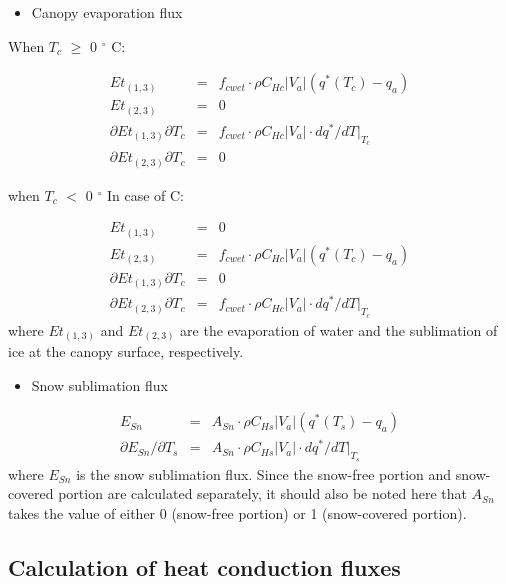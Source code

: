 \begin{itemize}
\tightlist
\item
  Canopy evaporation flux
\end{itemize}

When \(T_c\) \(\geq\) 0 \(^{\circ}\) C:

\begin{eqnarray}
 Et_{(1,3)} &=&
  f_{cwet} \cdot \rho C_{Hc}|V_a|(q^\ast(T_c) - q_a) \\
 Et_{(2,3)} &=& 0 \\
 \partial Et_{(1,3)} \partial T_c &=&
  f_{cwet} \cdot \rho C_{Hc}|V_a|\cdot dq^\ast/dT|_{T_c} \\
 \partial Et_{(2,3)} \partial T_c &=& 0
\end{eqnarray}

when \(T_c\) \(<\) 0 \(^{\circ}\) In case of C:

\begin{eqnarray}
 Et_{(1,3)} &=& 0 \\
 Et_{(2,3)} &=&
  f_{cwet} \cdot \rho C_{Hc}|V_a|(q^\ast(T_c) - q_a) \\
 \partial Et_{(1,3)} \partial T_c &=& 0 \\
 \partial Et_{(2,3)} \partial T_c &=&
  f_{cwet} \cdot \rho C_{Hc}|V_a|\cdot dq^\ast/dT|_{T_c}
\end{eqnarray} where \(Et_{(1,3)}\) and \(Et_{(2,3)}\) are the evaporation of water and the sublimation of ice at the canopy surface, respectively.

\begin{itemize}
\tightlist
\item
  Snow sublimation flux
\end{itemize}

\begin{eqnarray}
 E_{Sn} &=& A_{Sn}\cdot \rho C_{Hs}|V_a|(q^\ast(T_s) - q_a) \\
 \partial E_{Sn}/\partial T_s &=& A_{Sn}\cdot \rho C_{Hs}|V_a|
 \cdot dq^\ast/dT|_{T_s}
\end{eqnarray} where \(E_{Sn}\) is the snow sublimation flux. Since the snow-free portion and snow-covered portion are calculated separately, it should also be noted here that \(A_{Sn}\) takes the value of either
0 (snow-free portion) or 1 (snow-covered portion).

\subsection{Calculation of heat conduction fluxes}\label{calculation-of-heat-conduction-fluxes}

